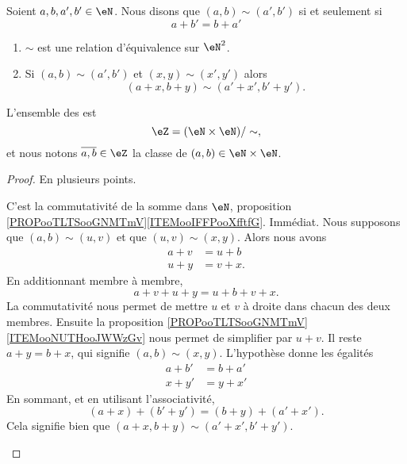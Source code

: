 \begin{propositionDef}     \label{PROPooFIKUooVHlvTt}
	Soient \( a,b,a',b'\in \eN\). Nous disons que \( (a,b)\sim(a',b')\) si et seulement si
	\begin{equation}
		a+b'=b+a'
	\end{equation}
	\begin{enumerate}
		\item
		      \( \sim\) est une relation d'équivalence sur \( \eN^2\).
		\item       \label{ITEMooZQSHooSDfdvK}
		      Si \( (a,b)\sim (a',b')\) et \( (x,y)\sim (x',y')\) alors
		      \begin{equation}
			      (a+x,b+y)\sim(a'+x',b'+y').
		      \end{equation}
	\end{enumerate}
	L'ensemble des  est
	\begin{equation}
		\eZ=(\eN\times \eN)/\sim,
	\end{equation}
	et nous notons \( \overline{ a,b }\in \eZ\) la classe de \( (a,b)\in \eN\times \eN\).
\end{propositionDef}

\begin{proof}
	En plusieurs points.
	\begin{subproof}
		\spitem[Symétrie]
		C'est la commutativité de la somme dans \( \eN\), proposition \ref{PROPooTLTSooGNMTmV}\ref{ITEMooIFFPooXfftfG}.
		\spitem[Réflexive]
		Immédiat.
		\spitem[Transitive]
		Nous supposons que \( (a,b)\sim(u,v)\) et que \( (u,v)\sim(x,y)\). Alors nous avons
		\begin{subequations}
			\begin{align}
				a+v & =u+b  \\
				u+y & =v+x.
			\end{align}
		\end{subequations}
		En additionnant membre à membre,
		\begin{equation}
			a+v+u+y=u+b+v+x.
		\end{equation}
		La commutativité nous permet de mettre \( u\) et \( v\) à droite dans chacun des deux membres. Ensuite la proposition \ref{PROPooTLTSooGNMTmV}\ref{ITEMooNUTHooJWWzGv} nous permet de simplifier par \( u+v\). Il reste \( a+y=b+x\), qui signifie \( (a,b)\sim(x,y)\).
		L'hypothèse donne les égalités
		\begin{subequations}
			\begin{align}
				a+b' & =b+a' \\
				x+y' & =y+x'
			\end{align}
		\end{subequations}
		En sommant, et en utilisant l'associativité,
		\begin{equation}
			(a+x)+(b'+y')=(b+y)+(a'+x').
		\end{equation}
		Cela signifie bien que \( (a+x,b+y)\sim(a'+x',b'+y')\).
	\end{subproof}
\end{proof}

